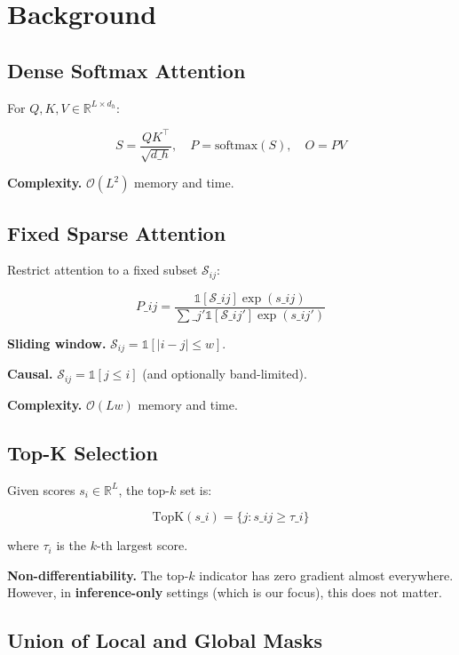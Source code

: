 
\section{Background}

\subsection{Dense Softmax Attention}

For $Q, K, V \in \mathbb{R}^{L \times d_h}$:

\[
S = \frac{QK^\top}{\sqrt{d\_h}}, \quad
P = \text{softmax}(S), \quad
O = PV
\tag{3.1}
\]

\textbf{Complexity.} $\mathcal{O}(L^2)$ memory and time.

\subsection{Fixed Sparse Attention}

Restrict attention to a fixed subset $\mathcal{S}_{ij}$:

\[
P\_{ij} = \frac{\mathbb{1}[\mathcal{S}\_{ij}] \exp(s\_{ij})}{\sum\_{j'} \mathbb{1}[\mathcal{S}\_{ij'}] \exp(s\_{ij'})}
\tag{3.2}
\]

\textbf{Sliding window.} $\mathcal{S}_{ij} = \mathbb{1}[|i - j| \leq w]$.

\textbf{Causal.} $\mathcal{S}_{ij} = \mathbb{1}[j \leq i]$ (and optionally band-limited).

\textbf{Complexity.} $\mathcal{O}(L w)$ memory and time.

\subsection{Top-K Selection}

Given scores $s_i \in \mathbb{R}^L$, the top-$k$ set is:

\[
\text{TopK}(s\_i) = \{j : s\_{ij} \geq \tau\_i\}
\tag{3.3}
\]

where $\tau_i$ is the $k$-th largest score.

\textbf{Non-differentiability.} The top-$k$ indicator has zero gradient almost 
everywhere. However, in \textbf{inference-only} settings (which is our focus), 
this does not matter.

\subsection{Union of Local and Global Masks}


